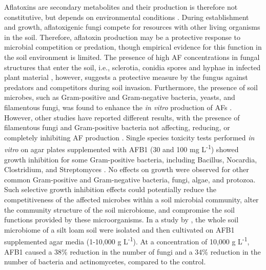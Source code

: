 Aflatoxins are secondary metabolites and their production is therefore not constitutive, but depends on environmental conditions \citep{carter2013aflatoxins}. During establishment and growth, aflatoxigenic fungi compete for resources with other living organisms in the soil. Therefore, aflatoxin production may be a protective response to microbial competition or predation, though empirical evidence for this function in the soil environment is limited. The presence of high AF concentrations in fungal structures that enter the soil, i.e., sclerotia, conidia spores and hyphae in infected plant material \citep{wicklow1983intrafungal}, however, suggests a protective measure by the fungus against predators and competitors during soil invasion. Furthermore, the presence of soil microbes, such as Gram-positive and Gram-negative bacteria, yeasts, and filamentous fungi, was found to enhance the \textit{in vitro} production of AFs \citep{weckbach1977aflatoxin, cuero1987stimulation, type1980interference}. However, other studies have reported different results, with the presence of filamentous fungi and Gram-positive bacteria not affecting, reducing, or completely inhibiting AF production \citep{weckbach1977aflatoxin, type1980interference}. Single species toxicity tests performed \textit{in vitro} on agar plates supplemented with AFB1 (30 and 100 mg L\textsuperscript{-1}) showed growth inhibition for some Gram-positive bacteria, including Bacillus, Nocardia, Clostridium, and Streptomyces \citep{burmeister1966survey, arai1967antimicrobial}. No effects on growth were observed for other common Gram-positive and Gram-negative bacteria, fungi, algae, and protozoa. Such selective growth inhibition effects could potentially reduce the competitiveness of the affected microbes within a soil microbial community, alter the community structure of the soil microbiome, and compromise the soil functions provided by these microorganisms. In a study by  \citet{angle1981aflatoxin}, the whole soil microbiome of a silt loam soil were isolated and then cultivated on AFB1 supplemented agar media (1-10,000 \textmu g L\textsuperscript{-1}). At a concentration of 10,000 \textmu g L\textsuperscript{-1}, AFB1 caused a 38\% reduction in the number of fungi and a 34\% reduction in the number of bacteria and actinomycetes, compared to the control.


